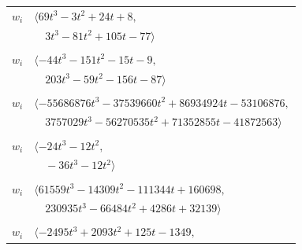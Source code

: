 \documentclass[11pt]{article}
\begin{document}
\begin{longtable}{@{}ll@{}}
$w_i$ & $\langle 69t^{3}-3t^{2}+24t+8,$\\
 & $\quad 3t^{3}-81t^{2}+105t-77\rangle$\\
\addlinespace[2pt]
\multicolumn{2}{@{}p{0.97\textwidth}@{}}{$i=38$, $D_i=64$, $\rho_{ij}$: $4{:}1, \allowbreak 7{:}1, \allowbreak 15{:}2, \allowbreak 18{:}1, \allowbreak 19{:}2, \allowbreak 26{:}2, \allowbreak 30{:}1, \allowbreak 57{:}1$}\\
$w_i$ & $\langle -44t^{3}-151t^{2}-15t-9,$\\
 & $\quad 203t^{3}-59t^{2}-156t-87\rangle$\\
\addlinespace[2pt]
\multicolumn{2}{@{}p{0.97\textwidth}@{}}{$i=39$, $D_i=1048576$, $\rho_{ij}$: $6{:}1, \allowbreak 9{:}1, \allowbreak 14{:}2, \allowbreak 15{:}1, \allowbreak 17{:}1, \allowbreak 18{:}2, \allowbreak 24{:}2, \allowbreak 26{:}1, \allowbreak 41{:}2, \allowbreak 54{:}2, \allowbreak 56{:}2, \allowbreak 59{:}1, \allowbreak 60{:}1, \allowbreak 64{:}2, \allowbreak 70{:}2$}\\
$w_i$ & $\langle -55686876t^{3}-37539660t^{2}+86934924t-53106876,$\\
 & $\quad 3757029t^{3}-56270535t^{2}+71352855t-41872563\rangle$\\
\addlinespace[2pt]
\multicolumn{2}{@{}p{0.97\textwidth}@{}}{$i=40$, $D_i=4$, $\rho_{ij}$: $0{:}1, \allowbreak 2{:}2, \allowbreak 37{:}2, \allowbreak 47{:}2, \allowbreak 58{:}2, \allowbreak 60{:}2$}\\
$w_i$ & $\langle -24t^{3}-12t^{2},$\\
 & $\quad -36t^{3}-12t^{2}\rangle$\\
\addlinespace[2pt]
\multicolumn{2}{@{}p{0.97\textwidth}@{}}{$i=41$, $D_i=8192$, $\rho_{ij}$: $9{:}2, \allowbreak 10{:}2, \allowbreak 11{:}2, \allowbreak 15{:}1, \allowbreak 16{:}2, \allowbreak 33{:}2, \allowbreak 39{:}1, \allowbreak 44{:}2, \allowbreak 59{:}2, \allowbreak 64{:}1, \allowbreak 71{:}2$}\\
$w_i$ & $\langle 61559t^{3}-14309t^{2}-111344t+160698,$\\
 & $\quad 230935t^{3}-66484t^{2}+4286t+32139\rangle$\\
\addlinespace[2pt]
\multicolumn{2}{@{}p{0.97\textwidth}@{}}{$i=42$, $D_i=64$, $\rho_{ij}$: $0{:}2, \allowbreak 3{:}1, \allowbreak 11{:}2, \allowbreak 27{:}2, \allowbreak 28{:}1, \allowbreak 32{:}2, \allowbreak 47{:}2, \allowbreak 50{:}2, \allowbreak 62{:}2, \allowbreak 63{:}2$}\\
$w_i$ & $\langle -2495t^{3}+2093t^{2}+125t-1349,$\\

\end{longtable}
\end{document}
